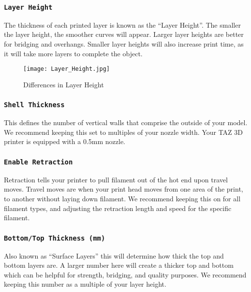 \subsubsection{\texttt{Layer Height}}
The thickness of each printed layer is known as the ``Layer Height''. The smaller the layer height, the smoother curves will appear. Larger layer heights are better for bridging and overhangs. Smaller layer heights will also increase print time, as it will take more layers to complete the object.
\begin{figure}[H]
\centering
\texttt{[image: Layer\_Height.jpg]}
\caption{Differences in Layer Height}
\label{fig:Differences in Layer Height}
\end{figure}


\subsubsection{\texttt{Shell Thickness}}
This defines the number of vertical walls that comprise the outside of your model. We recommend keeping this set to multiples of your nozzle width. Your TAZ 3D printer is equipped with a 0.5mm nozzle. %

\subsubsection{\texttt{Enable Retraction}}
Retraction tells your printer to pull filament out of the hot end upon travel moves. Travel moves are when your print head moves from one area of the print, to another without laying down filament. We recommend keeping this on for all filament types, and adjusting the retraction length and speed for the specific filament.

\subsubsection{\texttt{Bottom/Top Thickness (mm)}}
Also known as ``Surface Layers'' this will determine how thick the top and bottom layers are. A larger number here will create a thicker top and bottom which can be helpful for strength, bridging, and quality purposes. We recommend keeping this number as a multiple of your layer height.

